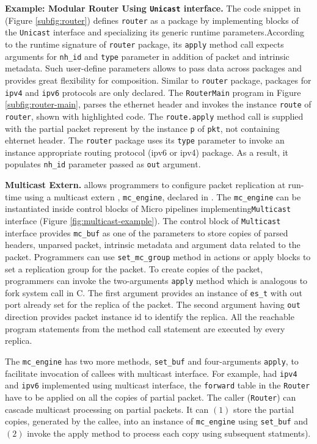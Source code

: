\documentclass[letterpaper,twocolumn,10pt]{article}
\begin{document}
\textbf{Example: Modular Router Using \texttt{Unicast} interface.}
The code snippet in (Figure \ref{subfig:router}) defines \texttt{router} as a package by implementing blocks of the \texttt{Unicast} interface and specializing its generic runtime parameters.\footnotemark[\value{footnote}]
According to the runtime signature of \texttt{router} package, its \texttt{apply} method call expects arguments for \texttt{nh\_id} and \texttt{type} parameter in addition of packet and intrinsic metadata.
Such user-define parameters allows to pass data across packages and provides great flexibility for composition.
Similar to \texttt{router} package, packages for \texttt{ipv4} and \texttt{ipv6} protocols are only declared.
The \texttt{RouterMain} program in Figure \ref{subfig:router-main}, parses the ethernet header and invokes the instance \texttt{route} of \texttt{router}, shown with highlighted code.
The \texttt{route.apply} method call is supplied with the partial packet represent by the instance \texttt{p} of \texttt{pkt}, not containing ehternet header.
The \texttt{router} package uses its \texttt{type} parameter to invoke an instance appropriate routing protocol (ipv6 or ipv4) package.
As a result, it populates \texttt{nh\_id} parameter passed as \texttt{out} argument.



\textbf{Multicast Extern.}
\ulang allows programmers to configure packet replication at run-time using a multicast extern , \texttt{mc\_engine}, declared in \uarch.
The \texttt{mc\_engine} can be instantiated inside control blocks of Micro pipelines implementing\texttt{Multicast} interface (Figure \ref{fig:multicast-example}).
The control block of \texttt{Multicast} interface provides \texttt{mc\_buf} as one of the parameters to store copies of parsed headers, unparsed packet, intrinsic metadata and argument data related to the packet.
Programmers can use \texttt{set\_mc\_group} method in actions or apply blocks to set a replication group for the packet.
To create copies of the packet, programmers can invoke the two-arguments \texttt{apply} method which is analogous to fork system call in C. 
The first argument provides an instance of \texttt{es\_t} with out port already set for the replica of the packet.
The second argument having \texttt{out} direction provides packet instance id to identify the replica.
All the reachable program statements from the method call statement are executed by every replica.

The \texttt{mc\_engine} has two more methods, \texttt{set\_buf} and four-arguments \texttt{apply}, to facilitate invocation of callees with multicast interface.
For example, had \texttt{ipv4} and \texttt{ipv6} implemented using multicast interface, the \texttt{forward} table in the \texttt{Router} \uprogram have to be applied on all the copies of partial packet.
The caller (\texttt{Router}) can cascade multicast processing on partial packets.
It can $(1)$ store the partial copies, generated by the callee, into an instance of \texttt{mc\_engine} using \texttt{set\_buf} and $(2)$ invoke the apply method to process each copy using subsequent statments). 
\end{document}
